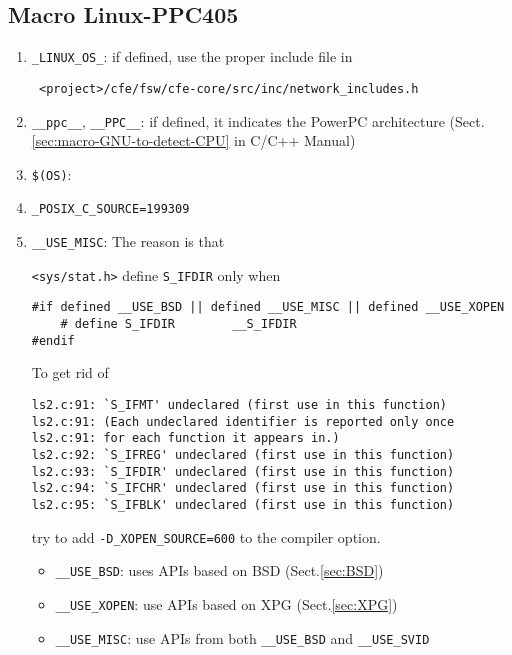\subsection{Macro Linux-PPC405}


\begin{enumerate}
  \item \verb!_LINUX_OS_!: if defined, use the proper include file in 
  
 \begin{verbatim}
 <project>/cfe/fsw/cfe-core/src/inc/network_includes.h
 \end{verbatim}
 
   \item \verb!__ppc__!,  \verb!__PPC__!: if defined, it indicates the PowerPC
  architecture (Sect.\ref{sec:macro-GNU-to-detect-CPU} in C/C++ Manual)
  
  \item \verb!$(OS)!: 
  
  \item \verb!_POSIX_C_SOURCE=199309!
  
  \item \verb!__USE_MISC!: The reason is that 
  
\verb!<sys/stat.h>! define \verb!S_IFDIR! only when
\begin{verbatim}
#if defined __USE_BSD || defined __USE_MISC || defined __USE_XOPEN
    # define S_IFDIR        __S_IFDIR
#endif
\end{verbatim}
To get rid of 
\begin{verbatim}
ls2.c:91: `S_IFMT' undeclared (first use in this function)
ls2.c:91: (Each undeclared identifier is reported only once
ls2.c:91: for each function it appears in.)
ls2.c:92: `S_IFREG' undeclared (first use in this function)
ls2.c:93: `S_IFDIR' undeclared (first use in this function)
ls2.c:94: `S_IFCHR' undeclared (first use in this function)
ls2.c:95: `S_IFBLK' undeclared (first use in this function)
\end{verbatim}
try to add \verb!-D_XOPEN_SOURCE=600! to the compiler option.


\begin{itemize}
  \item \verb!__USE_BSD!: uses APIs based on BSD (Sect.\ref{sec:BSD})
  
  \item \verb!__USE_XOPEN!: use APIs based on XPG (Sect.\ref{sec:XPG})
  
  \item \verb!__USE_MISC!: use APIs from both \verb!__USE_BSD! and
  \verb!__USE_SVID!
\end{itemize}
  

\end{enumerate}
